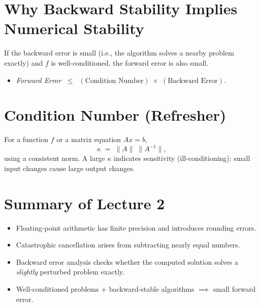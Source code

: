 \section*{Why Backward Stability Implies Numerical Stability}

If the backward error is small (i.e., the algorithm solves a nearby problem exactly) and $f$ is well-conditioned, the forward error is also small. 

\begin{itemize}
    \item \emph{Forward Error} $\;\le\;\; (\text{Condition Number}) \;\times\; (\text{Backward Error}).$
\end{itemize}

\section*{Condition Number (Refresher)}

For a function $f$ or a matrix equation $Ax = b$,
\[
\kappa \;=\; \|A\|\;\|A^{-1}\|,
\]
using a consistent norm. A large $\kappa$ indicates sensitivity (ill-conditioning): small input changes cause large output changes.

\section*{Summary of Lecture 2}

\begin{itemize}
    \item Floating-point arithmetic has finite precision and introduces rounding errors.
    \item Catastrophic cancellation arises from subtracting nearly equal numbers.
    \item Backward error analysis checks whether the computed solution solves a \emph{slightly} perturbed problem exactly.
    \item Well-conditioned problems + backward-stable algorithms $\implies$ small forward error.
\end{itemize}
